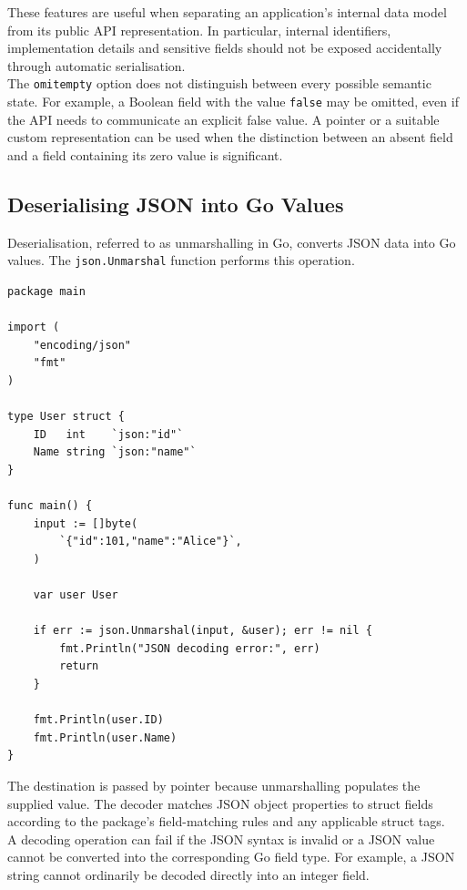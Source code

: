 These features are useful when separating an application's internal data model from its public API representation. In particular, internal identifiers, implementation details and sensitive fields should not be exposed accidentally through automatic serialisation.\\

The \texttt{omitempty} option does not distinguish between every possible semantic state. For example, a Boolean field with the value \texttt{false} may be omitted, even if the API needs to communicate an explicit false value. A pointer or a suitable custom representation can be used when the distinction between an absent field and a field containing its zero value is significant.

\subsection{Deserialising JSON into Go Values}

Deserialisation, referred to as unmarshalling in Go, converts JSON data into Go values. The \texttt{json.Unmarshal} function performs this operation.

\begin{lstlisting}
package main

import (
    "encoding/json"
    "fmt"
)

type User struct {
    ID   int    `json:"id"`
    Name string `json:"name"`
}

func main() {
    input := []byte(
        `{"id":101,"name":"Alice"}`,
    )

    var user User

    if err := json.Unmarshal(input, &user); err != nil {
        fmt.Println("JSON decoding error:", err)
        return
    }

    fmt.Println(user.ID)
    fmt.Println(user.Name)
}
\end{lstlisting}

The destination is passed by pointer because unmarshalling populates the supplied value. The decoder matches JSON object properties to struct fields according to the package's field-matching rules and any applicable struct tags.\\

A decoding operation can fail if the JSON syntax is invalid or a JSON value cannot be converted into the corresponding Go field type. For example, a JSON string cannot ordinarily be decoded directly into an integer field.\\

